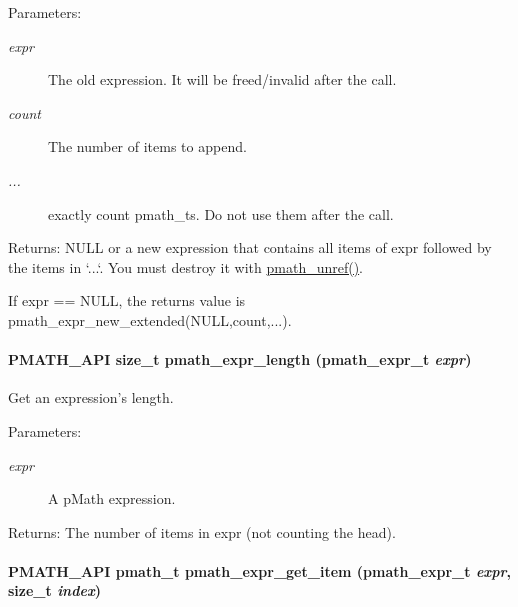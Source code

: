 \begin{Desc}
\item[Parameters:]
\begin{description}
\item[{\em expr}]The old expression. It will be freed/invalid after the call. \item[{\em count}]The number of items to append. \item[{\em ...}]exactly count pmath\_\-ts. Do not use them after the call. \end{description}
\end{Desc}
\begin{Desc}
\item[Returns:]NULL or a new expression that contains all items of expr followed by the items in `...`. You must destroy it with \hyperlink{classpmath__t_54e905402c38940687033b87eb8c6c9f}{pmath\_\-unref()}.\end{Desc}
If expr == NULL, the returns value is pmath\_\-expr\_\-new\_\-extended(NULL,count,...). \hypertarget{group__expressions_gf77c0a198380cd9b3e7e1a47f41f57c0}{
\paragraph[{pmath\_\-expr\_\-length}]{\setlength{\rightskip}{0pt plus 5cm}PMATH\_\-API size\_\-t pmath\_\-expr\_\-length ({\bf pmath\_\-expr\_\-t} {\em expr})}\hfill}
\label{group__expressions_gf77c0a198380cd9b3e7e1a47f41f57c0}


Get an expression's length. 

\begin{Desc}
\item[Parameters:]
\begin{description}
\item[{\em expr}]A pMath expression. \end{description}
\end{Desc}
\begin{Desc}
\item[Returns:]The number of items in expr (not counting the head). \end{Desc}
\hypertarget{group__expressions_g70b7099d22d00d94f52df167b4e42364}{
\paragraph[{pmath\_\-expr\_\-get\_\-item}]{\setlength{\rightskip}{0pt plus 5cm}PMATH\_\-API {\bf pmath\_\-t} pmath\_\-expr\_\-get\_\-item ({\bf pmath\_\-expr\_\-t} {\em expr}, \/  size\_\-t {\em index})}\hfill}
\label{group__expressions_g70b7099d22d00d94f52df167b4e42364}


